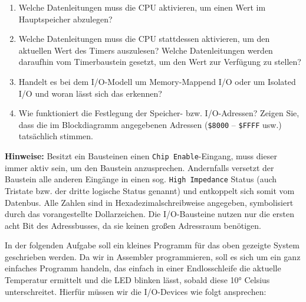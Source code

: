 \begin{enumerate}
    \item Welche Datenleitungen muss die CPU aktivieren, um einen Wert im
    Hauptspeicher abzulegen?

    \item Welche Datenleitungen muss die CPU stattdessen aktivieren, um den
    aktuellen Wert des Timers auszulesen? Welche Datenleitungen werden daraufhin
    vom Timerbaustein gesetzt, um den Wert zur Verfügung zu stellen?

    \item Handelt es bei dem I/O-Modell um \glqq{}Memory-Mappend I/O\grqq{}
    oder um \glqq{}Isolated I/O\grqq{} und woran lässt sich das erkennen?

    \item Wie funktioniert die Festlegung der Speicher- bzw. I/O-Adressen?
    Zeigen Sie, dass die im Blockdiagramm angegebenen Adressen
    (\texttt{\$8000} -- \texttt{\$FFFF} usw.) tatsächlich stimmen.
\end{enumerate}

\textbf{Hinweise:} Besitzt ein Bausteinen einen \texttt{Chip Enable}-Eingang,
muss dieser immer aktiv sein, um den Baustein anzusprechen. Andernfalls versetzt
der Baustein alle anderen Eingänge in einen sog. \texttt{High Impedance} Status
(auch Tristate bzw. der dritte logische Status genannt) und entkoppelt sich somit
vom Datenbus. Alle Zahlen sind in Hexadezimalschreibweise angegeben, symbolisiert
durch das vorangestellte Dollarzeichen. Die I/O-Bausteine nutzen nur die ersten
acht Bit des Adressbusses, da sie keinen großen Adressraum benötigen.


In der folgenden Aufgabe soll ein kleines Programm für das oben gezeigte
System geschrieben werden. Da wir in Assembler programmieren, soll es sich
um ein ganz einfaches Programm handeln, das einfach in einer Endlosschleife
die aktuelle Temperatur ermittelt und die LED blinken lässt, sobald diese
10° Celsius unterschreitet. Hierfür müssen wir die I/O-Devices wie folgt
ansprechen:

